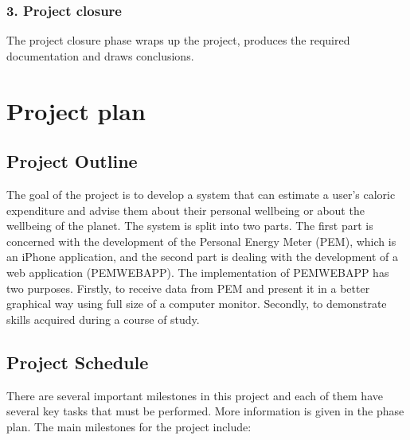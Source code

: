 \documentclass[12pt, a4paper]{report}   %
\begin{document}
\subsubsection{3. Project closure}
The project closure phase wraps up the project, produces the required documentation and draws conclusions.


\clearpage
\section{Project plan}
\subsection{Project Outline}
The goal of the project is to develop a system that can estimate a user's caloric expenditure and advise them about their personal wellbeing or about the wellbeing of the planet.
The system is split into two parts. The first part is concerned with the development of the Personal Energy Meter (PEM), which is an iPhone application, and the second part is dealing with the development of a web application (PEMWEBAPP). The implementation of PEMWEBAPP has two purposes. Firstly, to receive data from PEM and present it in a better graphical way using full size of a computer monitor. Secondly, to demonstrate skills acquired during a course of study.


\subsection{Project Schedule}
There are several important milestones in this project and each of them have several key tasks that must be performed. More information is given in the phase plan.
The main milestones for the project include:
\end{document}
